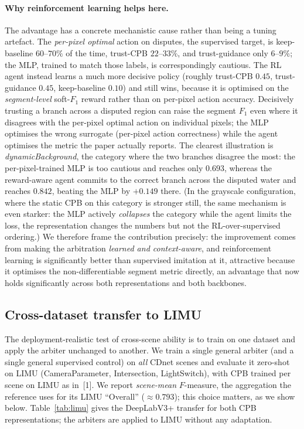 \documentclass[sn-basic]{sn-jnl}
\newcommand{\Fm}{$F$-measure}
\begin{document}
\paragraph{Why reinforcement learning helps here.}
The advantage has a concrete mechanistic cause rather than being a tuning artefact.
The \emph{per-pixel optimal} action on disputes, the supervised target, is
keep-baseline $60$--$70\%$ of the time, trust-CPB $22$--$33\%$, and trust-guidance
only $6$--$9\%$; the MLP, trained to match those labels, is correspondingly cautious.
The RL agent instead learns a much more decisive policy (roughly trust-CPB $0.45$,
trust-guidance $0.45$, keep-baseline $0.10$) and still wins, because it is optimised
on the \emph{segment-level} soft-$F_1$ reward rather than on per-pixel action
accuracy. Decisively trusting a branch across a disputed region can raise the
segment $F_1$ even where it disagrees with the per-pixel optimal action on individual
pixels; the MLP optimises the wrong surrogate (per-pixel action correctness) while
the agent optimises the metric the paper actually reports. The clearest illustration
is \textit{dynamicBackground}, the category where the two branches disagree the most:
the per-pixel-trained MLP is too cautious and reaches only $0.693$, whereas the
reward-aware agent commits to the correct branch across the disputed water and reaches
$0.842$, beating the MLP by $+0.149$ there. (In the grayscale configuration, where the
static CPB on this category is stronger still, the same mechanism is even starker: the
MLP actively \emph{collapses} the category while the agent limits the loss, the
representation changes the numbers but not the RL-over-supervised ordering.) We
therefore frame the contribution precisely: the improvement comes from making the
arbitration \emph{learned and context-aware}, and reinforcement learning is
significantly better than supervised imitation at it, attractive because it
optimises the non-differentiable segment metric directly, an advantage that now
holds significantly across both representations and both backbones.

\subsection{Cross-dataset transfer to LIMU}
\label{sec:transfer}
The deployment-realistic test of cross-scene ability is to train on one dataset and
apply the arbiter unchanged to another. We train a single general arbiter (and a single
general supervised control) on \emph{all} CDnet scenes and evaluate it zero-shot on
LIMU (CameraParameter, Intersection, LightSwitch), with CPB trained per scene on LIMU
as in~[1]. We report \emph{scene-mean} \Fm, the aggregation the reference uses for its
LIMU ``Overall'' ($\approx0.793$); this choice matters, as we show below. Table~\ref{tab:limu}
gives the DeepLabV3+ transfer for both CPB representations; the arbiters are applied to
LIMU without any adaptation.
\end{document}
